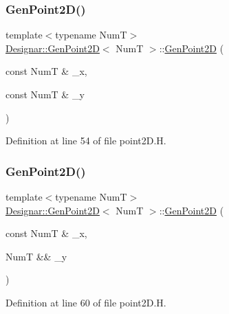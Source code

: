 \subsubsection{\texorpdfstring{Gen\+Point2\+D()}{GenPoint2D()}\hspace{0.1cm}{\footnotesize\ttfamily [2/7]}}
{\footnotesize\ttfamily template$<$typename NumT$>$ \\
\hyperlink{class_designar_1_1_gen_point2_d}{Designar\+::\+Gen\+Point2D}$<$ NumT $>$\+::\hyperlink{class_designar_1_1_gen_point2_d}{Gen\+Point2D} (\begin{DoxyParamCaption}\item[{const NumT \&}]{\+\_\+x,  }\item[{const NumT \&}]{\+\_\+y }\end{DoxyParamCaption})\hspace{0.3cm}{\ttfamily [inline]}}



Definition at line 54 of file point2\+D.\+H.

\mbox{\label{class_designar_1_1_gen_point2_d_a7e3357422dc01310240f58fed213162d}} 
\subsubsection{\texorpdfstring{Gen\+Point2\+D()}{GenPoint2D()}\hspace{0.1cm}{\footnotesize\ttfamily [3/7]}}
{\footnotesize\ttfamily template$<$typename NumT$>$ \\
\hyperlink{class_designar_1_1_gen_point2_d}{Designar\+::\+Gen\+Point2D}$<$ NumT $>$\+::\hyperlink{class_designar_1_1_gen_point2_d}{Gen\+Point2D} (\begin{DoxyParamCaption}\item[{const NumT \&}]{\+\_\+x,  }\item[{NumT \&\&}]{\+\_\+y }\end{DoxyParamCaption})\hspace{0.3cm}{\ttfamily [inline]}}



Definition at line 60 of file point2\+D.\+H.

\mbox{\label{class_designar_1_1_gen_point2_d_ab4e177989279ac6e6f7280644f487cdd}} 
